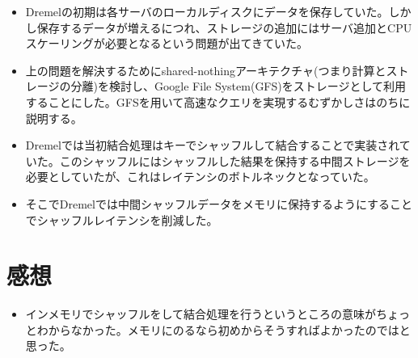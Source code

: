\documentclass[dvipdfmx,uplatex]{jsarticle}
\theoremstyle{remark}
\newenvironment{method}[1]{
    \begin{tcolorbox}[
        colframe=green!50!black,
        colback=green!50!black!10!white,
        colbacktitle=green!50!black!40!white,
        coltitle=black,
        fonttitle=\bfseries,
        title={#1}
    ]
}{
    \end{tcolorbox}
}
\newenvironment{kansou}{
    \begin{tcolorbox}[
        colframe=brown,
        colback=brown!10!white,
        colbacktitle=brown!40!white,
        coltitle=black,fonttitle=\bfseries
    ]
}{
    \end{tcolorbox}
}
\begin{document}
\begin{method}{計算とストレージの分離}
\begin{itemize}
    \item Dremelの初期は各サーバのローカルディスクにデータを保存していた。しかし保存するデータが増えるにつれ、ストレージの追加にはサーバ追加とCPUスケーリングが必要となるという問題が出てきていた。
    \item 上の問題を解決するためにshared-nothingアーキテクチャ(つまり計算とストレージの分離)を検討し、Google File System(GFS)をストレージとして利用することにした。GFSを用いて高速なクエリを実現するむずかしさはのちに説明する。
    \item Dremelでは当初結合処理はキーでシャッフルして結合することで実装されていた。このシャッフルにはシャッフルした結果を保持する中間ストレージを必要としていたが、これはレイテンシのボトルネックとなっていた。
    \item そこでDremelでは中間シャッフルデータをメモリに保持するようにすることでシャッフルレイテンシを削減した。
\end{itemize}
\end{method}

\section{感想}
\begin{kansou}
\begin{itemize}
  \item インメモリでシャッフルをして結合処理を行うというところの意味がちょっとわからなかった。メモリにのるなら初めからそうすればよかったのではと思った。
\end{itemize}
\end{kansou}



\end{document}
